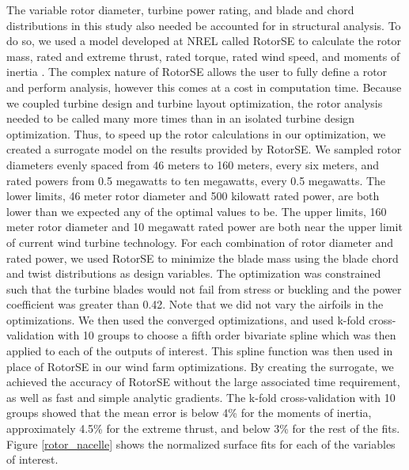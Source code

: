 \documentclass[WESD, manuscript]{copernicus}
\begin{document}
The variable rotor diameter, turbine power rating, and blade and chord distributions in this study also needed be accounted for in structural analysis.  To do so, we used a model developed at NREL called RotorSE  to calculate the rotor mass, rated and extreme thrust, rated torque, rated wind speed, and moments of inertia \citep{ning2013rotorse}. The complex nature of RotorSE allows the user to fully define a rotor and perform analysis, however this comes at a cost in computation time. Because we coupled turbine design and turbine layout optimization, the rotor analysis needed to be called many more times than in an isolated turbine design optimization. 
Thus, to speed up the rotor calculations in our optimization, we created a surrogate model on the results provided by RotorSE. We sampled rotor diameters evenly spaced from 46 meters to 160 meters, every six meters, and rated powers from 0.5 megawatts to ten megawatts, every 0.5 megawatts. The lower limits, 46 meter rotor diameter and 500 kilowatt rated power, are both lower than we expected any of the optimal values to be. The upper limits, 160 meter rotor diameter and 10 megawatt rated power are both near the upper limit of current wind turbine technology. For each combination of rotor diameter and rated power, we used RotorSE to minimize the blade mass using the blade chord and twist distributions as design variables. The optimization was constrained such that the turbine blades would not fail from stress or buckling and the power coefficient was greater than 0.42. Note that we did not vary the airfoils in the optimizations. 
We then used the converged optimizations, and used k-fold cross-validation with 10 groups to choose a fifth order bivariate spline which was then applied to each of the outputs of interest. This spline function was then used in place of RotorSE in our wind farm optimizations. By creating the surrogate, we achieved the accuracy of RotorSE without the large associated time requirement, as well as fast and simple analytic gradients. 
The k-fold cross-validation with 10 groups showed that the mean error is below 4\% for the moments of inertia, approximately 4.5\% for the extreme thrust, and below 3\% for the rest of the fits. 
Figure \ref{rotor_nacelle} shows the normalized surface fits for each of the variables of interest.
\end{document}
